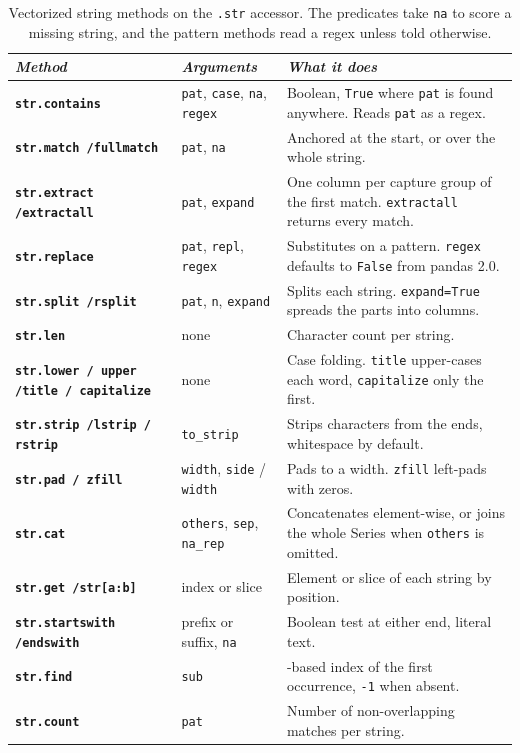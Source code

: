 \begin{table}[H]
\centering
\footnotesize
\renewcommand{\arraystretch}{1.4}
\begin{tabularx}{\textwidth}{>{\raggedright\arraybackslash}p{} >{\raggedright\arraybackslash}p{} >{\raggedright\arraybackslash}X}
\toprule
\textit{Method} & \textit{Arguments} & \textit{What it does} \\
\midrule
\textbf{\texttt{str.contains}} & \texttt{pat}, \texttt{case}, \texttt{na}, \texttt{regex} & Boolean, \texttt{True} where \texttt{pat} is found anywhere. Reads \texttt{pat} as a regex. \\
\textbf{\texttt{str.match /\allowbreak fullmatch}} & \texttt{pat}, \texttt{na} & Anchored at the start, or over the whole string. \\
\textbf{\texttt{str.extract /\allowbreak extractall}} & \texttt{pat}, \texttt{expand} & One column per capture group of the first match. \texttt{extractall} returns every match. \\
\textbf{\texttt{str.replace}} & \texttt{pat}, \texttt{repl}, \texttt{regex} & Substitutes on a pattern. \texttt{regex} defaults to \texttt{False} from pandas 2.0. \\
\textbf{\texttt{str.split /\allowbreak rsplit}} & \texttt{pat}, \texttt{n}, \texttt{expand} & Splits each string. \texttt{expand=True} spreads the parts into columns. \\
\textbf{\texttt{str.len}} & none & Character count per string. \\
\textbf{\texttt{str.lower / upper /\allowbreak title / capitalize}} & none & Case folding. \texttt{title} upper-cases each word, \texttt{capitalize} only the first. \\
\textbf{\texttt{str.strip /\allowbreak lstrip / rstrip}} & \texttt{to\_strip} & Strips characters from the ends, whitespace by default. \\
\textbf{\texttt{str.pad / zfill}} & \texttt{width}, \texttt{side} / \texttt{width} & Pads to a width. \texttt{zfill} left-pads with zeros. \\
\textbf{\texttt{str.cat}} & \texttt{others}, \texttt{sep}, \texttt{na\_rep} & Concatenates element-wise, or joins the whole Series when \texttt{others} is omitted. \\
\textbf{\texttt{str.get /\allowbreak str[a:b]}} & index or slice & Element or slice of each string by position. \\
\textbf{\texttt{str.startswith /\allowbreak endswith}} & prefix or suffix, \texttt{na} & Boolean test at either end, literal text. \\
\textbf{\texttt{str.find}} & \texttt{sub} & 0-based index of the first occurrence, \texttt{-1} when absent. \\
\textbf{\texttt{str.count}} & \texttt{pat} & Number of non-overlapping matches per string. \\
\bottomrule
\end{tabularx}
\caption*{Vectorized string methods on the \texttt{.str} accessor. The predicates take \texttt{na} to score a missing string, and the pattern methods read a regex unless told otherwise.}
\end{table}

\newpage
